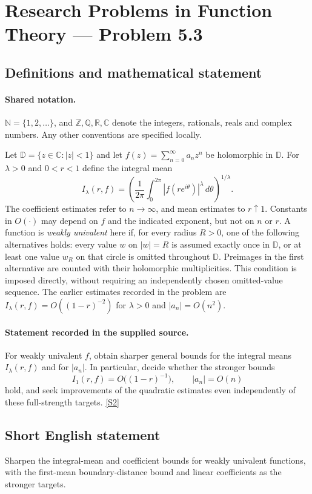 \documentclass[11pt]{book}
\newcommand{\sref}[2]{\hyperlink{source:#1:#2}{[S#2]}}
\begin{document}
\section{Research Problems in Function Theory — Problem 5.3}\label{statement}

\subsection{Definitions and mathematical statement}

\paragraph{Shared notation.}$\mathbb N=\{1,2,\ldots\}$, and $\mathbb Z,\mathbb Q,\mathbb R,\mathbb C$ denote the integers, rationals, reals and complex numbers. Any other conventions are specified locally.


Let $\mathbb D=\{z\in\mathbb C:|z|<1\}$ and let $f(z)=\sum_{n=0}^\infty a_nz^n$ be holomorphic in $\mathbb D$. For $\lambda>0$ and $0<r<1$ define the integral mean
\[I_\lambda(r,f)=\left(\frac1{2\pi}\int_0^{2\pi}|f(re^{i\theta})|^\lambda\,d\theta\right)^{1/\lambda}.
\]
The coefficient estimates refer to $n\to\infty$, and mean estimates to $r\uparrow1$. Constants in $O(\cdot)$ may depend on $f$ and the indicated exponent, but not on $n$ or $r$. A function is \emph{weakly univalent} here if, for every radius $R>0$, one of the following alternatives holds: every value $w$ on $|w|=R$ is assumed exactly once in $\mathbb D$, or at least one value $w_R$ on that circle is omitted throughout $\mathbb D$. Preimages in the first alternative are counted with their holomorphic multiplicities. This condition is imposed directly, without requiring an independently chosen omitted-value sequence.
The earlier estimates recorded in the problem are $I_\lambda(r,f)=O((1-r)^{-2})$ for $\lambda>0$ and $|a_n|=O(n^2)$.
\paragraph{Statement recorded in the supplied source.}
For weakly univalent $f$, obtain sharper general bounds for the integral means $I_\lambda(r,f)$ and for $|a_n|$. In particular, decide whether the stronger bounds
\[I_1(r,f)=O\bigl((1-r)^{-1}\bigr),\qquad |a_n|=O(n)
\]
hold, and seek improvements of the quadratic estimates even independently of these full-strength targets. \sref{statement}{2}
\subsection{Short English statement}
Sharpen the integral-mean and coefficient bounds for weakly univalent functions, with the first-mean boundary-distance bound and linear coefficients as the stronger targets.
\end{document}
